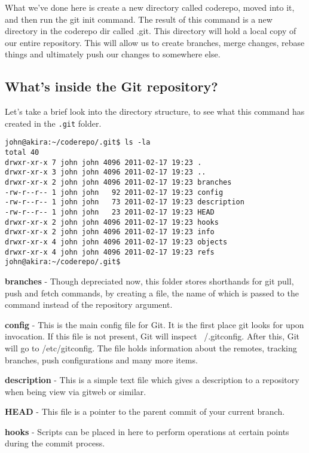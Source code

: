 What we've done here is create a new directory called coderepo, moved into it, and then run the git init command.  The result of this command is a new directory in the coderepo dir called .git.  This directory will hold a local copy of our entire repository.  This will allow us to create branches, merge changes, rebase things and ultimately push our changes to somewhere else.


\subsection{What's inside the Git repository?}

Let's take a brief look into the directory structure, to see what this command has created in the \texttt{.git} folder.

\begin{Verbatim}[frame=single,fontsize=\relsize{-3}] 
john@akira:~/coderepo/.git$ ls -la 
total 40 
drwxr-xr-x 7 john john 4096 2011-02-17 19:23 . 
drwxr-xr-x 3 john john 4096 2011-02-17 19:23 .. 
drwxr-xr-x 2 john john 4096 2011-02-17 19:23 branches 
-rw-r--r-- 1 john john   92 2011-02-17 19:23 config 
-rw-r--r-- 1 john john   73 2011-02-17 19:23 description 
-rw-r--r-- 1 john john   23 2011-02-17 19:23 HEAD 
drwxr-xr-x 2 john john 4096 2011-02-17 19:23 hooks 
drwxr-xr-x 2 john john 4096 2011-02-17 19:23 info 
drwxr-xr-x 4 john john 4096 2011-02-17 19:23 objects 
drwxr-xr-x 4 john john 4096 2011-02-17 19:23 refs 
john@akira:~/coderepo/.git$ 
\end{Verbatim} 

\textbf{branches} - Though depreciated now, this folder stores shorthands for git pull, push and fetch commands, by creating a file, the name of which is passed to the command instead of the repository argument.

\textbf{config} - This is the main config file for Git.  It is the first place git looks for upon invocation.  If this file is not present, Git will inspect ~/.gitconfig.  After this, Git will go to /etc/gitconfig.  The file holds information about the remotes, tracking branches, push configurations and many more items.

\textbf{description} - This is a simple text file which gives a description to a repository when being view via gitweb or similar.

\textbf{HEAD} - This file is a pointer to the parent commit of your current branch.

\textbf{hooks} - Scripts can be placed in here to perform operations at certain points during the commit process.

